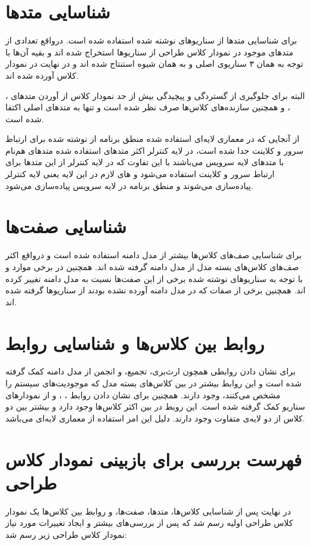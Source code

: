 \documentclass{report}
\begin{document}
\section{شناسایی متدها}
برای شناسایی متدها از سناریوهای نوشته شده استفاده شده است. درواقع تعدادی از متدهای موجود در نمودار کلاس طراحی از سناریوها استخراج شده اند و بقیه آن‌ها با توجه به همان ۳ سناریوی اصلی و به همان شیوه استنتاج شده اند و در نهایت در نمودار کلاس آورده شده اند.

البته برای جلوگیری از گستردگی و پیچیدگی بیش از حد نمودار کلاس از آوردن متدهای
 ،
، و همچنین سازنده‌های کلاس‌ها صرف نظر شده است و تنها به متدهای اصلی اکتفا شده است.

از آنجایی که در معماری لایه‌ای استفاده شده منطق برنامه از
نوشته شده برای ارتباظ سرور و کلاینت جدا شده است، در لایه کنترلر اکثر متدهای استفاده شده متدهای هم‌نام با متدهای لایه‌ سرویس می‌باشند با این تفاوت که در لایه کنترلر از این متدها برای ارتباط سرور و کلاینت استفاده می‌شود و
های لازم در این لایه یعنی لایه کنترلر پیاده‌سازی می‌شوند و منطق برنامه در لایه سرویس پیاده‌سازی می‌شود.


\section{شناسایی صفت‌ها}
برای شناسایی صف‌های کلاس‌ها بیشتر از مدل دامنه استفاده شده است و درواقع اکثر صف‌های کلاس‌های بسته مدل از مدل دامنه گرفته شده اند. همچنین در برخی موارد و با توجه به سناریوهای نوشته شده برخی از این صفت‌ها نسبت به مدل دامنه تغییر کرده اند. همچنین برخی از صفات که در مدل دامنه آورده نشده بودند از سناریوها گرفته شده اند.
\section{روابط بین کلاس‌ها و شناسایی روابط}
برای نشان دادن روابطی همچون ارث‌بری، تجمیع، و انجمن از مدل دامنه کمک گرفته شده است و این روابط بیشتر در بین کلاس‌های بسته مدل که موجودیت‌های سیستم را مشخص می‌کنند، وجود دارند.
همچنین برای نشان دادن روابط
 ، 
، و 
از نمودارهای سناریو کمک گرفته شده است. این روبط در بین اکثر کلاس‌ها وجود دارد و بیشتر بین دو کلاس از دو لایه‌ی متفاوت وجود دارند. دلیل این امر استفاده از معماری لایه‌ای می‌باشد.
\section{فهرست بررسی برای بازبینی نمودار کلاس طراحی}
در نهایت پس از شناسایی کلاس‌ها، متدها، صفت‌ها، و روابط بین کلاس‌ها یک نمودار کلاس طراحی اولیه رسم شد که پس از بررسی‌های بیشتر و ایجاد تغییرات مورد نیاز نمودار کلاس طراحی زیر رسم شد:
\end{document}
